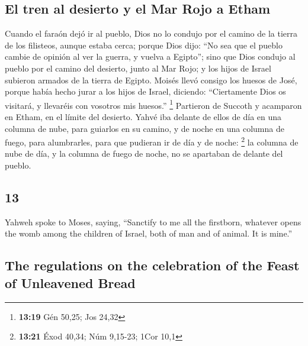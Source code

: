 \begin{paracol}{2}
\hypertarget{el-tren-al-desierto-y-el-mar-rojo-a-etham}{%
\subsection{El tren al desierto y el Mar Rojo a
Etham}\label{el-tren-al-desierto-y-el-mar-rojo-a-etham}}

 Cuando el faraón dejó ir al pueblo, Dios no lo condujo
por el camino de la tierra de los filisteos, aunque estaba cerca; porque
Dios dijo: ``No sea que el pueblo cambie de opinión al ver la guerra, y
vuelva a Egipto'';  sino que Dios condujo al pueblo por
el camino del desierto, junto al Mar Rojo; y los hijos de Israel
subieron armados de la tierra de Egipto.  Moisés llevó
consigo los huesos de José, porque había hecho jurar a los hijos de
Israel, diciendo: ``Ciertamente Dios os visitará, y llevaréis con
vosotros mis huesos.'' \footnote{\textbf{13:19} Gén 50,25; Jos 24,32}
 Partieron de Succoth y acamparon en Etham, en el límite
del desierto.  Yahvé iba delante de ellos de día en una
columna de nube, para guiarlos en su camino, y de noche en una columna
de fuego, para alumbrarles, para que pudieran ir de día y de noche:
\footnote{\textbf{13:21} Éxod 40,34; Núm 9,15-23; 1Cor 10,1}
 la columna de nube de día, y la columna de fuego de
noche, no se apartaban de delante del pueblo.

\switchcolumn
\begin{otherlanguage}{english}

\hypertarget{section-25}{%
\section{13}\label{section-25}}

 Yahweh spoke to Moses, saying,  ``Sanctify
to me all the firstborn, whatever opens the womb among the children of
Israel, both of man and of animal. It is mine.''

\hypertarget{the-regulations-on-the-celebration-of-the-feast-of-unleavened-bread}{%
\subsection{The regulations on the celebration of the Feast of
Unleavened
Bread}\label{the-regulations-on-the-celebration-of-the-feast-of-unleavened-bread}}


\end{otherlanguage}
\end{paracol}
